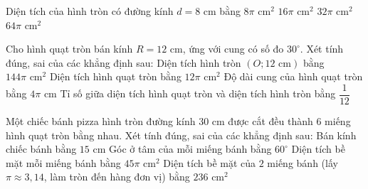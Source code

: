 \begin{ex}%
	Diện tích của hình tròn có đường kính $d = 8\text{ cm}$ bằng
	\choice
	{$8\pi\text{ cm}^2$}
	{\True $16\pi\text{ cm}^2$}
	{$32\pi\text{ cm}^2$}
	{$64\pi\text{ cm}^2$}
\end{ex}

\begin{ex}%
	Cho hình quạt tròn bán kính $R = 12\text{ cm}$, ứng với cung có số đo $30^\circ$. Xét tính đúng, sai của các khẳng định sau:
	\choiceTF
	{\True Diện tích hình tròn $(O; 12\text{ cm})$ bằng $144\pi\text{ cm}^2$}
	{\True Diện tích hình quạt tròn bằng $12\pi\text{ cm}^2$}
	{Độ dài cung của hình quạt tròn bằng $4\pi\text{ cm}$}
	{\True Tỉ số giữa diện tích hình quạt tròn và diện tích hình tròn bằng $\dfrac{1}{12}$}
\end{ex}

\begin{ex}%
	Một chiếc bánh pizza hình tròn đường kính $30\text{ cm}$ được cắt đều thành $6$ miếng hình quạt tròn bằng nhau. Xét tính đúng, sai của các khẳng định sau:
	\choiceTF
	{\True Bán kính chiếc bánh bằng $15\text{ cm}$}
	{\True Góc ở tâm của mỗi miếng bánh bằng $60^\circ$}
	{Diện tích bề mặt mỗi miếng bánh bằng $45\pi\text{ cm}^2$}
	{\True Diện tích bề mặt của $2$ miếng bánh (lấy $\pi \approx 3{,}14$, làm tròn đến hàng đơn vị) bằng $236\text{ cm}^2$}
\end{ex}

